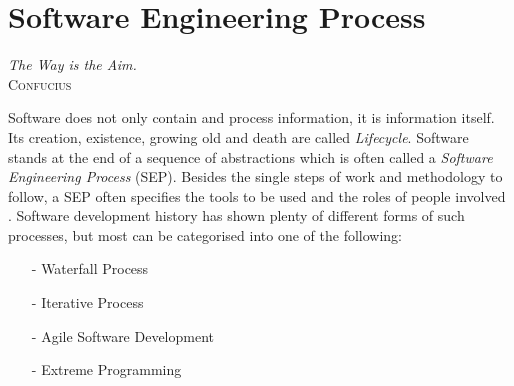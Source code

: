 %
%
%
%
%
%
%

\chapter{Software Engineering Process}
\label{software_engineering_process_heading}

\begin{flushright}
    \textsl{The Way is the Aim.}\\
    \textsc{Confucius}
\end{flushright}

Software does not only contain and process information, it is information itself.
Its creation, existence, growing old and death are called \emph{Lifecycle}.
Software stands at the end of a sequence of abstractions which is often called a
\emph{Software Engineering Process} (SEP). Besides the single steps of work and
methodology to follow, a SEP often specifies the tools to be used and the roles
of people involved \cite{balzert}. Software development history has shown plenty
of different forms of such processes, but most can be categorised into one of
the following:

\begin{itemize}
    \item[-] Waterfall Process
    \item[-] Iterative Process
    \item[-] Agile Software Development
    \item[-] Extreme Programming
\end{itemize}

